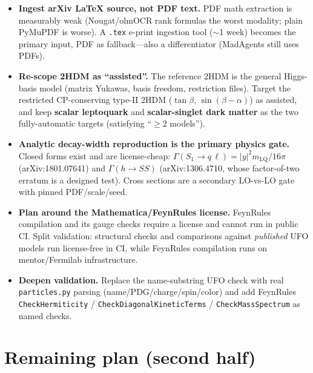 \documentclass[11pt]{article}
\newcommand{\code}[1]{\texttt{#1}}
\begin{document}
\begin{itemize}
  \item \textbf{Ingest arXiv LaTeX source, not PDF text.} PDF math extraction is
  measurably weak (Nougat/olmOCR rank formulas the worst modality; plain PyMuPDF
  is worse). A \code{.tex} e-print ingestion tool ($\sim$1 week) becomes the
  primary input, PDF as fallback---also a differentiator (MadAgents still uses
  PDFs).
  \item \textbf{Re-scope 2HDM as ``assisted''.} The reference 2HDM is the general
  Higgs-basis model (matrix Yukawas, basis freedom, restriction files). Target
  the restricted CP-conserving type-II 2HDM ($\tan\beta$, $\sin(\beta-\alpha)$) as
  assisted, and keep \textbf{scalar leptoquark} and \textbf{scalar-singlet dark
  matter} as the two fully-automatic targets (satisfying ``$\ge$2 models'').
  \item \textbf{Analytic decay-width reproduction is the primary physics gate.}
  Closed forms exist and are license-cheap: $\Gamma(S_1\!\to\! q\,\ell) =
  |y|^2 m_{\mathrm{LQ}}/16\pi$ (arXiv:1801.07641) and $\Gamma(h\!\to\! SS)$
  (arXiv:1306.4710, whose factor-of-two erratum is a designed test). Cross
  sections are a secondary LO-vs-LO gate with pinned PDF/scale/seed.
  \item \textbf{Plan around the Mathematica/FeynRules license.} FeynRules
  compilation and its gauge checks require a license and cannot run in public CI.
  Split validation: structural checks and comparisons against \emph{published}
  UFO models run license-free in CI, while FeynRules compilation runs on
  mentor/Fermilab infrastructure.
  \item \textbf{Deepen validation.} Replace the name-substring UFO check with real
  \code{particles.py} parsing (name/PDG/charge/spin/color) and add FeynRules
  \code{CheckHermiticity} / \code{CheckDiagonalKineticTerms} /
  \code{CheckMassSpectrum} as named checks.
\end{itemize}

\section{Remaining plan (second half)}
\label{sec:remaining}
\end{document}
